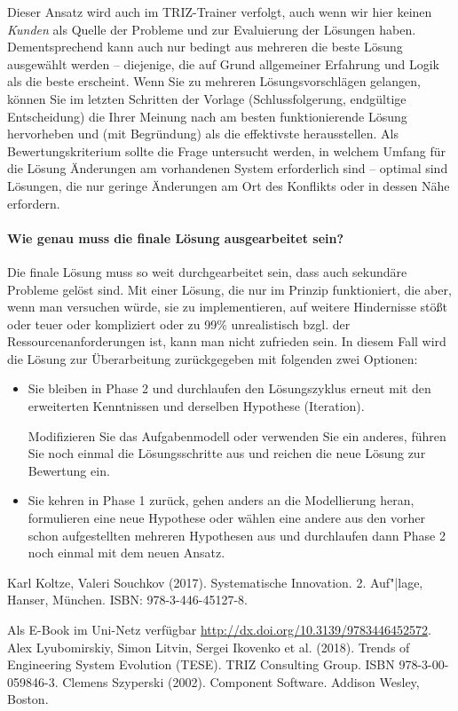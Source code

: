 \documentclass[11pt,a4paper]{article}
\begin{document}
Dieser Ansatz wird auch im TRIZ-Trainer verfolgt, auch wenn wir hier keinen
\emph{Kunden} als Quelle der Probleme und zur Evaluierung der Lösungen haben.
Dementsprechend kann auch nur bedingt aus mehreren die beste Lösung ausgewählt
werden -- diejenige, die auf Grund allgemeiner Erfahrung und Logik als die
beste erscheint. Wenn Sie zu mehreren Lösungsvorschlägen gelangen, können Sie
im letzten Schritten der Vorlage (Schlussfolgerung, endgültige Entscheidung)
die Ihrer Meinung nach am besten funktionierende Lösung hervorheben und (mit
Begründung) als die effektivste herausstellen.  Als Bewertungskriterium sollte
die Frage untersucht werden, in welchem Umfang für die Lösung Änderungen am
vorhandenen System erforderlich sind -- optimal sind Lösungen, die nur geringe
Änderungen am Ort des Konflikts oder in dessen Nähe erfordern.

\paragraph{Wie genau muss die finale Lösung ausgearbeitet sein?}
Die finale Lösung muss so weit durchgearbeitet sein, dass auch sekundäre
Probleme gelöst sind.  Mit einer Lösung, die nur im Prinzip funktioniert, die
aber, wenn man versuchen würde, sie zu implementieren, auf weitere Hindernisse
stößt oder teuer oder kompliziert oder zu 99\% unrealistisch bzgl. der
Ressourcenanforderungen ist, kann man nicht zufrieden sein.  In diesem Fall
wird die Lösung zur Überarbeitung zurückgegeben mit folgenden zwei Optionen:
\begin{itemize}
\item Sie bleiben in Phase 2 und durchlaufen den Lösungszyklus erneut mit den
  erweiterten Kenntnissen und derselben Hypothese (Iteration).
  
  Modifizieren Sie das Aufgabenmodell oder verwenden Sie ein anderes, führen
  Sie noch einmal die Lösungsschritte aus und reichen die neue Lösung zur
  Bewertung ein.
\item Sie kehren in Phase 1 zurück, gehen anders an die Modellierung heran,
  formulieren eine neue Hypothese oder wählen eine andere aus den vorher
  schon aufgestellten mehreren Hypothesen aus und durchlaufen dann Phase 2
  noch einmal mit dem neuen  Ansatz.
\end{itemize}


\begin{thebibliography}{xxx}
 Karl Koltze, Valeri Souchkov (2017). Systematische
  Innovation.  2. Auf"|lage, Hanser, München.  ISBN: 978-3-446-45127-8.

  Als E-Book im Uni-Netz verfügbar
  \url{http://dx.doi.org/10.3139/9783446452572}.
 Alex Lyubomirskiy, Simon Litvin, Sergei Ikovenko et al.
  (2018).  Trends of Engineering System Evolution (TESE).  TRIZ Consulting
  Group. ISBN 978-3-00-059846-3.
 Clemens Szyperski (2002). Component Software. Addison
  Wesley, Boston. 
\end{thebibliography}
\end{document}

